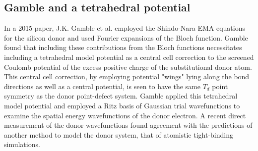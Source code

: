 







\subsection{Gamble and a tetrahedral potential}

In a 2015 paper\cite{Gamble}, J.K. Gamble et al. employed the Shindo-Nara EMA
equations for the silicon donor and used Fourier expansions of the Bloch
function. Gamble found that including these contributions from the Bloch
functions necessitates including a tetrahedral model potential as a central cell
correction to the screened Coulomb potential of the excess positive charge of
the substitutional donor atom. This central cell correction, by employing
potential "wings" lying along the bond directions as well as a central
potential, is seen to have the same $T_{d}$ point symmetry as the donor
point-defect system. Gamble applied this tetrahedral model potential and
employed a Ritz basis of Gaussian trial wavefunctions to examine the spatial
energy wavefunctions of the donor electron. A recent direct measurement of the
donor \cite{Salfi} wavefunctions found agreement with the predictions of another
method to model the donor system, that of atomistic tight-binding simulations.

